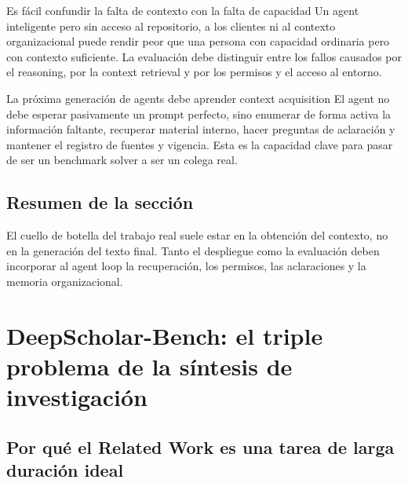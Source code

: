 \documentclass[a4paper]{article}
\begin{document}
\begin{warningbox}{Es fácil confundir la falta de contexto con la falta de capacidad}
Un agent inteligente pero sin acceso al repositorio, a los clientes ni al contexto organizacional puede rendir peor que una persona con capacidad ordinaria pero con contexto suficiente. La evaluación debe distinguir entre los fallos causados por el reasoning, por la context retrieval y por los permisos y el acceso al entorno.
\end{warningbox}

\begin{importantbox}{La próxima generación de agents debe aprender context acquisition}
El agent no debe esperar pasivamente un prompt perfecto, sino enumerar de forma activa la información faltante, recuperar material interno, hacer preguntas de aclaración y mantener el registro de fuentes y vigencia. Esta es la capacidad clave para pasar de ser un benchmark solver a ser un colega real.
\end{importantbox}


\subsection{Resumen de la sección}

El cuello de botella del trabajo real suele estar en la obtención del contexto, no en la generación del texto final. Tanto el despliegue como la evaluación deben incorporar al agent loop la recuperación, los permisos, las aclaraciones y la memoria organizacional.

\section{DeepScholar-Bench: el triple problema de la síntesis de investigación}

\subsection{Por qué el Related Work es una tarea de larga duración ideal}

\end{document}
